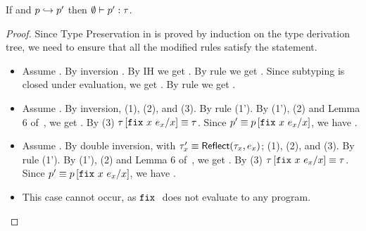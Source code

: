 \begin{lemma}
If \hastype{\emptyset}{\prog}{\typ}
       and $\evals{\prog}{\prog'}$ then $\emptyset \vdash p' : \tau$.
\end{lemma}
\begin{proof}
Since Type Preservation in \undeclang is proved by induction on the type derivation tree, 
we need to ensure that all the modified rules satisfy the statement. 
\begin{itemize}
\item\rtexact
 Assume 
 	.
 By inversion
	.
 By IH we get 
	.
 By rule \rtexact we get 
 	.
 Since subtyping is closed under evaluation, we get 
 	                {}.
 By rule \rtsub we get 
 	.

\item\rtlet
  Assume 
	.
 By inversion, 
     (1), 
    (2), and
   \iswellformed{\env}{\typ} (3). 
 By rule \rtfix
     (1').
 By (1'), (2) and Lemma 6 of~\citep{Vazou14-tech}, we get 
   . 
 By (3)
   $ {\tau}\left[\mathtt{fix}\ {x}\ e_x/x\right] \equiv \tau$.    
 Since 
   $p' \equiv {\ensuremath{p}}\left[\mathtt{fix}\ {x}\ {e_x}/x\right]$, 
 we have 
 . 

\item\rtreflect
  Assume 
	.
 By double inversion, with $\tau_x' \equiv \mathsf{Reflect}(\tau_x, e_x) $; 
     (1), 
    (2), and
   \iswellformed{\env}{\typ} (3). 
 By rule \rtfix
     (1').
 By (1'), (2) and Lemma 6 of~\citep{Vazou14-tech}, we get 
   . 
 By (3)
   $ {\tau}\left[\mathtt{fix}\ {x}\ e_x/x\right] \equiv \tau$.    
 Since 
   $p' \equiv {\ensuremath{p}}\left[\mathtt{fix}\ {x}\ {e_x}/x\right]$, 
 we have 
 . 

\item\rtfix
  This case cannot occur, as $\mathtt{fix}\ {}$ does not evaluate to any program. 
\end{itemize}
\end{proof}
